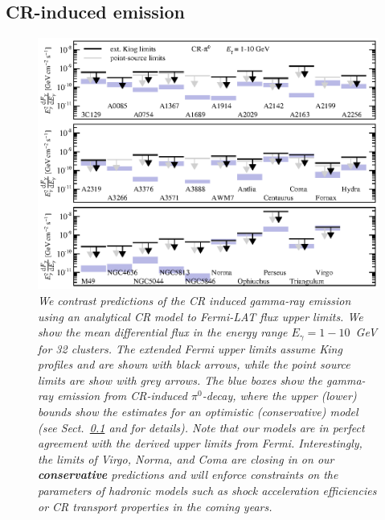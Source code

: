 \documentclass[10pt,aps,pra,reprint,amsmath,amsfonts,amssymb,showpacs,nofootinbib,floatfix]{revtex4-1}
\def\C#1{{\bf #1}}
\newcommand{\Fermi}{{\em Fermi}\xspace}
\begin{document}
\subsection{CR-induced emission}
\label{sec:CRemission}
\begin{figure}
\begin{minipage}{2.0\columnwidth}
  \includegraphics[width=0.99\columnwidth]{figures/Fermi.comp.CR.diff.eps}
  \caption{\it We contrast predictions of the CR induced gamma-ray
    emission using an analytical CR model \protect
    \cite{2010MNRAS.409..449P} to \Fermi-LAT flux upper limits. We
    show the mean differential flux in the energy range
    $E_\gamma=1-10$~GeV for 32 clusters. The extended \Fermi upper
    limits assume King profiles and are shown with black arrows, while
    the point source limits are show with grey arrows. The blue boxes
    show the gamma-ray emission from CR-induced $\pi^0$-decay, where
    the upper (lower) bounds show the estimates for an optimistic
    (conservative) model (see Sect.~\ref{sec:CRemission} and
    \cite{2010MNRAS.409..449P} for details). Note that our models are
    in perfect agreement with the derived upper limits from
    \Fermi. Interestingly, the limits of Virgo, Norma, and Coma are
    closing in on our \C{conservative} predictions and will enforce
    constraints on the parameters of hadronic models such as shock
    acceleration efficiencies or CR transport properties in the coming
    years.}
 \label{fig15}
\end{minipage}
\end{figure}
\end{document}
